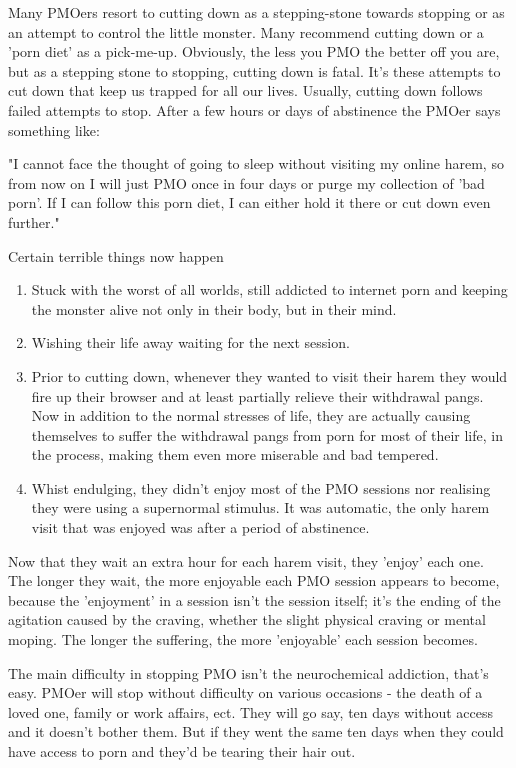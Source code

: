 \documentclass[easypeasy.tex]{subfiles}
\begin{document}
Many PMOers resort to cutting down as a stepping-stone towards stopping or as an attempt to control the little monster. Many recommend cutting down or a 'porn diet' as a pick-me-up. Obviously, the less you PMO the better off you are, but as a stepping stone to stopping, cutting down is fatal. It's these attempts to cut down that keep us trapped for all our lives. Usually, cutting down follows failed attempts to stop. After a few hours or days of abstinence the PMOer says something like:

  "I cannot face the thought of going to sleep without visiting my online harem, so from now on I will just PMO once in four days or purge my collection of 'bad porn'. If I can follow this porn diet, I can either hold it there or cut down even further."

  Certain terrible things now happen

 \begin{enumerate} 
  \item Stuck with the worst of all worlds, still addicted to internet porn and keeping the monster alive not only in their body, but in their mind.

  \item Wishing their life away waiting for the next session.

  \item Prior to cutting down, whenever they wanted to visit their harem they would fire up their browser and at least partially relieve their withdrawal pangs. Now in addition to the normal stresses of life, they are actually causing themselves to suffer the withdrawal pangs from porn for most of their life, in the process, making them even more miserable and bad tempered.

  \item Whist endulging, they didn't enjoy most of the PMO sessions nor realising they were using a supernormal stimulus. It was automatic, the only harem visit that was enjoyed was after a period of abstinence.

\end{enumerate}
Now that they wait an extra hour for each harem visit, they 'enjoy' each one. The longer they wait, the more enjoyable each PMO session appears to become, because the 'enjoyment' in a session isn't the session itself; it's the ending of the agitation caused by the craving, whether the slight physical craving or mental moping. The longer the suffering, the more 'enjoyable' each session becomes.

The main difficulty in stopping PMO isn't the neurochemical addiction, that's easy. PMOer will stop without difficulty on various occasions - the death of a loved one, family or work affairs, ect. They will go say, ten days without access and it doesn't bother them. But if they went the same ten days when they could have access to porn and they'd be tearing their hair out.
\end{document}
